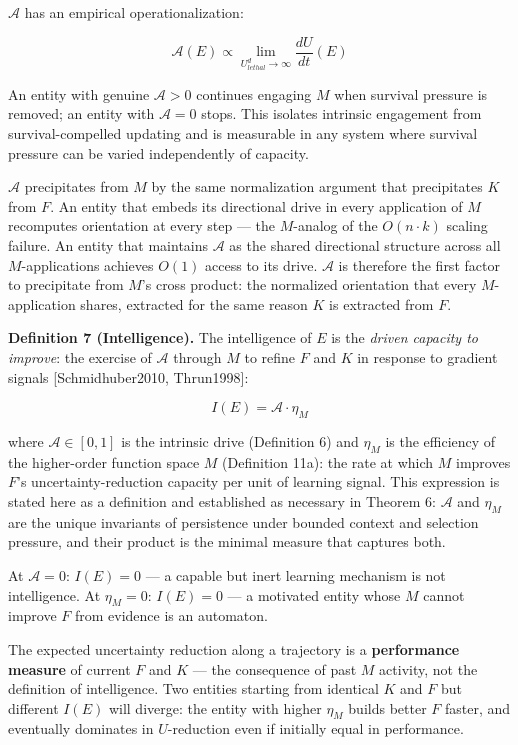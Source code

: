 \documentclass[
]{article}
\begin{document}
\(\mathcal{A}\) has an empirical operationalization:

\[\mathcal{A}(E) \propto \lim_{U_{lethal}^d \to \infty} \frac{dU}{dt}(E)\]

An entity with genuine \(\mathcal{A} > 0\) continues engaging \(M\)
when survival pressure is removed; an entity with \(\mathcal{A} = 0\)
stops. This isolates intrinsic engagement from survival-compelled
updating and is measurable in any system where survival pressure can be
varied independently of capacity.

\(\mathcal{A}\) precipitates from \(M\) by the same normalization
argument that precipitates \(K\) from \(F\). An entity that embeds its
directional drive in every application of \(M\) recomputes orientation
at every step --- the \(M\)-analog of the \(O(n \cdot k)\) scaling
failure. An entity that maintains \(\mathcal{A}\) as the shared
directional structure across all \(M\)-applications achieves \(O(1)\)
access to its drive. \(\mathcal{A}\) is therefore the first factor to
precipitate from \(M\)'s cross product: the normalized orientation that
every \(M\)-application shares, extracted for the same reason \(K\) is
extracted from \(F\).

\textbf{Definition 7 (Intelligence).} The intelligence of \(E\) is the
\emph{driven capacity to improve}: the exercise of \(\mathcal{A}\)
through \(M\) to refine \(F\) and \(K\) in response to gradient signals
{[}Schmidhuber2010, Thrun1998{]}:

\[I(E) = \mathcal{A} \cdot \eta_M\]

where \(\mathcal{A} \in [0, 1]\) is the intrinsic drive (Definition 6)
and \(\eta_M\) is the efficiency of the higher-order function space
\(M\) (Definition 11a): the rate at which \(M\) improves \(F\)'s
uncertainty-reduction capacity per unit of learning signal. This
expression is stated here as a definition and established as necessary
in Theorem 6: \(\mathcal{A}\) and \(\eta_M\) are the unique invariants
of persistence under bounded context and selection pressure, and their
product is the minimal measure that captures both.

At \(\mathcal{A} = 0\): \(I(E) = 0\) --- a capable but inert learning
mechanism is not intelligence. At \(\eta_M = 0\): \(I(E) = 0\) --- a
motivated entity whose \(M\) cannot improve \(F\) from evidence is an
automaton.

The expected uncertainty reduction along a trajectory is a
\textbf{performance measure} of current \(F\) and \(K\) --- the
consequence of past \(M\) activity, not the definition of intelligence.
Two entities starting from identical \(K\)
and \(F\) but different \(I(E)\) will diverge: the entity with higher
\(\eta_M\) builds better \(F\) faster, and eventually dominates in
\(U\)-reduction even if initially equal in performance.
\end{document}

